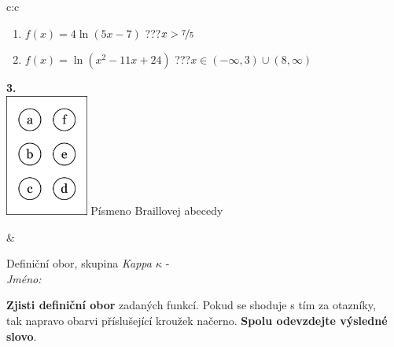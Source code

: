 \documentclass[10pt]{report}
\begin{document}
\begin{tabular}{c:c}
\begin{minipage}[c][104.5mm][t]{0.5\linewidth}
\begin{center}
\begin{minipage}{0.79\linewidth}
\begin{center}
\begin{varwidth}{\linewidth}
\begin{enumerate}
\item $f(x)=4\ln{(5x-7)}$\quad \dotfill\; ???\;\dotfill \quad $x>\nicefrac{7}{5}$
\item $f(x)=\ln{(x^2-11x+24)}$\quad \dotfill\; ???\;\dotfill \quad $x\in(-\infty , 3)\cup(8 , \infty)$
\end{enumerate}
\end{varwidth}
\end{center}
\end{minipage}
\begin{minipage}{0.20\linewidth}
\begin{center}
{\Huge\bfseries 3.} \\[2mm]
\includegraphics[height=40mm]{../images/braille.png}
{\small Písmeno Braillovej abecedy}
\end{center}
\end{minipage}
\end{center}
\end{minipage}
&
\begin{minipage}[c][104.5mm][t]{0.5\linewidth}
\begin{center}
\vspace{7mm}
{\huge Definiční obor, skupina \textit{Kappa $\kappa$} -}\\[5mm]
\textit{Jméno:}\phantom{xxxxxxxxxxxxxxxxxxxxxxxxxxxxxxxxxxxxxxxxxxxxxxxxxxxxxxxxxxxxxxxxx}\\[5mm]
\begin{minipage}{0.95\linewidth}
\begin{center}
\textbf{Zjisti definiční obor} zadaných funkcí. Pokud se shoduje s tím za otazníky,\\tak napravo obarvi příslušející kroužek načerno. \textbf{Spolu odevzdejte výsledné slovo}.
\end{center}
\end{minipage}
\\[1mm]
\begin{minipage}{0.79\linewidth}
\begin{center}
\begin{varwidth}{\linewidth}
\begin{enumerate}

\end{enumerate}
\end{varwidth}
\end{center}
\end{minipage}
\end{center}
\end{minipage}
\end{tabular}
\end{document}
